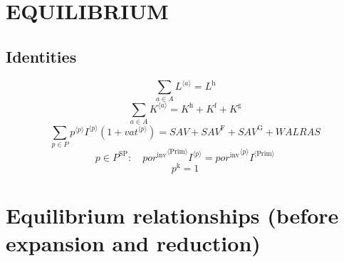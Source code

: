 \section{EQUILIBRIUM}

\subsection{Identities}

\begin{equation}
\sum_{a\in A} {L}^{\langle a\rangle} = L^{\mathrm{h}}
\end{equation}
\begin{equation}
\sum_{a\in A} {K}^{\langle a\rangle} = K^{\mathrm{h}} + K^{\mathrm{f}} + K^{\mathrm{g}}
\end{equation}
\begin{equation}
\sum_{p\in P} {{p}^{\langle p\rangle}} {{I}^{\langle p\rangle}} \left(1 + {{v\!a\!t}}^{\langle p\rangle}\right) = {S\!A\!V} + {S\!A\!V}^{\mathrm{F}} + {S\!A\!V}^{\mathrm{G}} + {W\!A\!L\!R\!A\!S}
\end{equation}
\begin{equation}
p\in P^{\mathrm{SP}}\colon\quad {{{p\!o\!r}^{\mathrm{inv}}}^{\langle \mathrm{\mathrm{Prim}}\rangle}} {{I}^{\langle p\rangle}} = {{{p\!o\!r}^{\mathrm{inv}}}^{\langle p\rangle}} {{I}^{\langle \mathrm{Prim}\rangle}}
\end{equation}
\begin{equation}
p^{\mathrm{k}} = 1
\end{equation}




\section{Equilibrium relationships (before expansion and reduction)}

